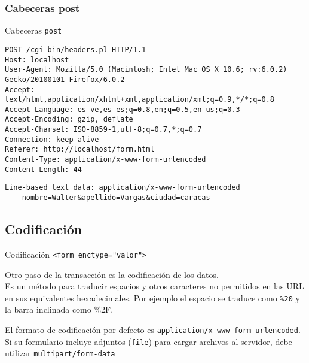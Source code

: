 \documentclass{beamer}
\begin{document}
\subsubsection{Cabeceras post} 

\begin{frame}[fragile]{Cabeceras \texttt{post}} %

\footnotesize{
\begin{verbatim}
POST /cgi-bin/headers.pl HTTP/1.1
Host: localhost
User-Agent: Mozilla/5.0 (Macintosh; Intel Mac OS X 10.6; rv:6.0.2) Gecko/20100101 Firefox/6.0.2
Accept: text/html,application/xhtml+xml,application/xml;q=0.9,*/*;q=0.8
Accept-Language: es-ve,es-es;q=0.8,en;q=0.5,en-us;q=0.3
Accept-Encoding: gzip, deflate
Accept-Charset: ISO-8859-1,utf-8;q=0.7,*;q=0.7
Connection: keep-alive
Referer: http://localhost/form.html
Content-Type: application/x-www-form-urlencoded
Content-Length: 44    
\end{verbatim}

\begin{verbatim}
Line-based text data: application/x-www-form-urlencoded
    nombre=Walter&apellido=Vargas&ciudad=caracas    
\end{verbatim}
}
\end{frame}


\subsection{Codificación} %

\begin{frame}{Codificación \texttt{<form enctype="valor">}} %
    \begin{center}
        Otro paso de la transacción es la codificación de los datos.\\
        Es un método para traducir espacios y otros caracteres no permitidos en
        las URL en sus equivalentes hexadecimales. Por ejemplo el espacio se
        traduce como \texttt{\%20} y la barra inclinada como \%2F.\\[0.4cm] 
        \pause

        El formato de codificación por defecto es
        \texttt{application/x-www-form-urlencoded}.\\[0.4cm] 
        \pause
        Si su formulario incluye adjuntos (\texttt{file}) para cargar archivos
        al servidor, debe utilizar \texttt{multipart/form-data}
    \end{center}
\end{frame}
\end{document}
